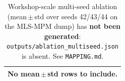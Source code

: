 \begin{table}[t]
  \centering
  \small
  \caption{Workshop-scale multi-seed ablation (mean\,$\pm$\,std over seeds 42/43/44 on the MLS-MPM dump) has \textbf{not been generated}: \texttt{outputs/ablation\_multiseed.json} is absent. See \texttt{MAPPING.md}.}
  \label{tab:ac-jepa-ablation-multiseed}
  \begin{tabular}{l}
    \toprule
    No mean\,$\pm$\,std rows to include. \\
    \bottomrule
  \end{tabular}
\end{table}
